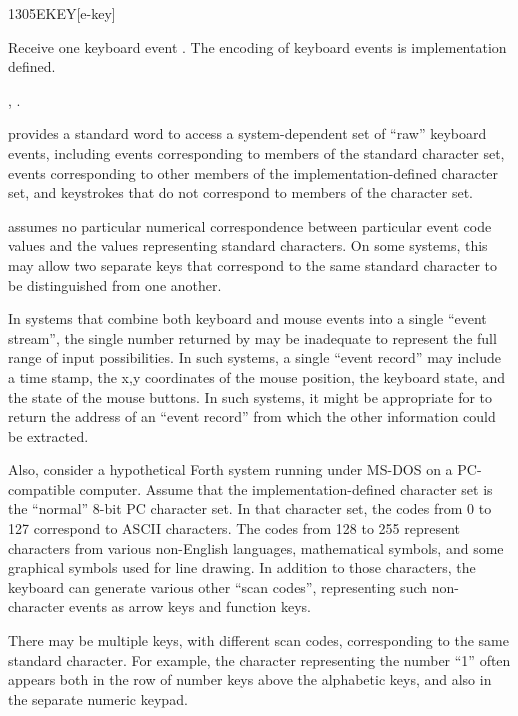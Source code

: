 \begin{worddef}{1305}{EKEY}[e-key]
\item {}

	Receive one keyboard event . The encoding of keyboard events
	is implementation defined.

\see {},
	.

	\begin{defer}
	\rationale %
		 provides a standard word to access a system-dependent
		set of ``raw'' keyboard events, including events corresponding
		to members of the standard character set, events corresponding
		to other members of the implementation-defined character set,
		and keystrokes that do not correspond to members of the
		character set.

		 assumes no particular numerical correspondence
		between particular event code values and the values representing
		standard characters. On some systems, this may allow two
		separate keys that correspond to the same standard character
		to be distinguished from one another.

		In systems that combine both keyboard and mouse events into a
		single ``event stream'', the single number returned by
		 may be inadequate to represent the full range of
		input possibilities. In such systems, a single ``event record''
		may include a time stamp, the x,y coordinates of the mouse
		position, the keyboard state, and the state of the mouse
		buttons. In such systems, it might be appropriate for 
		to return the address of an ``event record'' from which the
		other information could be extracted.

		Also, consider a hypothetical Forth system running under
		MS-DOS on a PC-compatible computer. Assume that the
		implementation-defined character set is the ``normal'' 8-bit
		PC character set. In that character set, the codes from 0 to
		127 correspond to ASCII characters. The codes from 128 to 255
		represent characters from various non-English languages,
		mathematical symbols, and some graphical symbols used for line
		drawing. In addition to those characters, the keyboard can
		generate various other ``scan codes'', representing such
		non-character events as arrow keys and function keys.

		There may be multiple keys, with different scan codes,
		corresponding to the same standard character. For example,
		the character representing the number ``1'' often appears both
		in the row of number keys above the alphabetic keys, and also
		in the separate numeric keypad.


\end{defer}
\end{worddef}
